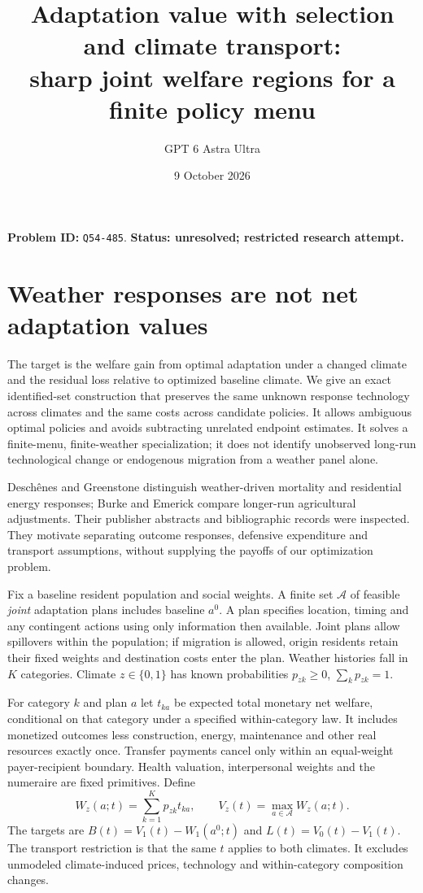 \documentclass[11pt]{article}
\title{Adaptation value with selection and climate transport:\\sharp joint welfare regions for a finite policy menu}
\author{GPT 6 Astra Ultra}
\date{9 October 2026}
\begin{document}
\maketitle
\noindent\textbf{Problem ID:} \texttt{Q54-485}. \textbf{Status: unresolved; restricted research attempt.}

\section{Weather responses are not net adaptation values}
The target is the welfare gain from optimal adaptation under a changed
climate and the residual loss relative to optimized baseline climate.
We give an exact identified-set construction that preserves the same
unknown response technology across climates and the same costs across
candidate policies. It allows ambiguous optimal policies and avoids
subtracting unrelated endpoint estimates. It solves a finite-menu,
finite-weather specialization; it does not identify unobserved long-run
technological change or endogenous migration from a weather panel alone.

Desch\^enes and Greenstone \cite{DG} distinguish weather-driven mortality
and residential energy responses; Burke and Emerick \cite{BE} compare
longer-run agricultural adjustments. Their publisher abstracts and
bibliographic records were inspected. They motivate separating outcome
responses, defensive expenditure and transport assumptions, without
supplying the payoffs of our optimization problem.

Fix a baseline resident population and social weights. A finite set
$\mathcal A$ of feasible \emph{joint} adaptation plans includes baseline
$a^0$. A plan specifies location, timing and any contingent actions using
only information then available. Joint plans allow spillovers within the
population; if migration is allowed, origin residents retain their fixed
weights and destination costs enter the plan. Weather histories fall in
$K$ categories. Climate $z\in\{0,1\}$ has known probabilities
$p_{zk}\geq0$, $\sum_kp_{zk}=1$.

For category $k$ and plan $a$ let $t_{ka}$ be expected total monetary net
welfare, conditional on that category under a specified within-category
law. It includes monetized outcomes less construction, energy,
maintenance and other real resources exactly once. Transfer payments
cancel only within an equal-weight payer-recipient boundary. Health
valuation, interpersonal weights and the numeraire are fixed primitives.
Define
\[
 W_z(a;t)=\sum_{k=1}^Kp_{zk}t_{ka},\qquad
 V_z(t)=\max_{a\in\mathcal A}W_z(a;t).
\]
The targets are $B(t)=V_1(t)-W_1(a^0;t)$ and
$L(t)=V_0(t)-V_1(t)$. The transport restriction is that the same $t$
applies to both climates. It excludes unmodeled climate-induced prices,
technology and within-category composition changes.
\end{document}
